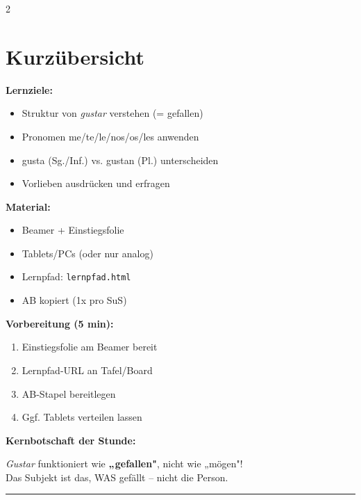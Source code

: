 \documentclass[10pt, a4paper]{article}
\newcommand{\es}[1]{\textcolor{spanisch}{\textit{#1}}}
\begin{document}
\begin{multicols}{2}

\section*{Kurzübersicht}

\textbf{Lernziele:}
\begin{itemize}[nosep, leftmargin=1.5em]
    \item Struktur von \es{gustar} verstehen (= gefallen)
    \item Pronomen me/te/le/nos/os/les anwenden
    \item gusta (Sg./Inf.) vs. gustan (Pl.) unterscheiden
    \item Vorlieben ausdrücken und erfragen
\end{itemize}

\textbf{Material:}
\begin{itemize}[nosep, leftmargin=1.5em]
    \item[$\Box$] Beamer + Einstiegsfolie
    \item[$\Box$] Tablets/PCs (oder nur analog)
    \item[$\Box$] Lernpfad: \texttt{lernpfad.html}
    \item[$\Box$] AB kopiert (1x pro SuS)
\end{itemize}

\columnbreak

\textbf{Vorbereitung (5 min):}
\begin{enumerate}[nosep, leftmargin=1.5em]
    \item Einstiegsfolie am Beamer bereit
    \item Lernpfad-URL an Tafel/Board
    \item AB-Stapel bereitlegen
    \item Ggf. Tablets verteilen lassen
\end{enumerate}

\textbf{Kernbotschaft der Stunde:}

\begin{tippbox}
\es{Gustar} funktioniert wie \textbf{„gefallen"}, nicht wie „mögen"!\\
Das Subjekt ist das, WAS gefällt -- nicht die Person.
\end{tippbox}

\end{multicols}

\vspace{-8pt}
\hrule
\vspace{6pt}
\end{document}

